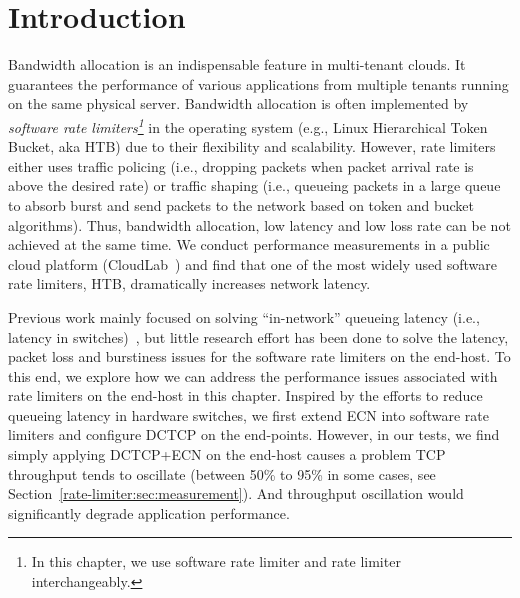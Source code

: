 \section{Introduction}
\label{rate-limiter:sec:introduction}

Bandwidth allocation is an indispensable feature in multi-tenant clouds. 
It guarantees the performance of various applications from multiple tenants running on the same physical server. 
Bandwidth allocation is often implemented by \textit{software rate limiters\footnote{In this chapter,
we use software rate limiter and rate limiter interchangeably.}} 
in the operating system (e.g., Linux Hierarchical Token Bucket, aka HTB) due to their flexibility and scalability.
However, rate limiters either uses traffic policing (i.e., dropping packets when
packet arrival rate is above the desired rate) or traffic shaping (i.e., queueing packets in a large
queue to absorb burst and send packets to the network based on token and bucket algorithms).
Thus, bandwidth allocation, low latency and low loss rate can be not achieved at the same time. 
We conduct performance measurements in a public cloud platform (CloudLab~\cite{cloudlab}) and 
find that one of the most widely used software rate limiters, HTB, dramatically increases network latency.

Previous work mainly focused on solving ``in-network'' queueing latency (i.e., latency in 
switches)~\cite{alizadeh2010data,he2016ac,mittal2015timely}, but little research effort has been
done to solve the latency, packet loss and burstiness issues for the software rate limiters on the end-host.
To this end, we explore how we can address the performance issues associated with rate limiters on the end-host in this chapter.
Inspired by the efforts to reduce queueing latency in hardware switches, 
we first extend ECN into software rate limiters and configure DCTCP on the end-points. 
However, in our tests, we find simply applying DCTCP+ECN on the end-host causes a problem \textemdash\xspace 
TCP throughput tends to oscillate (between 50\% to 95\% in some cases, see Section~\ref{rate-limiter:sec:measurement}). 
And throughput oscillation would significantly degrade application performance. 


